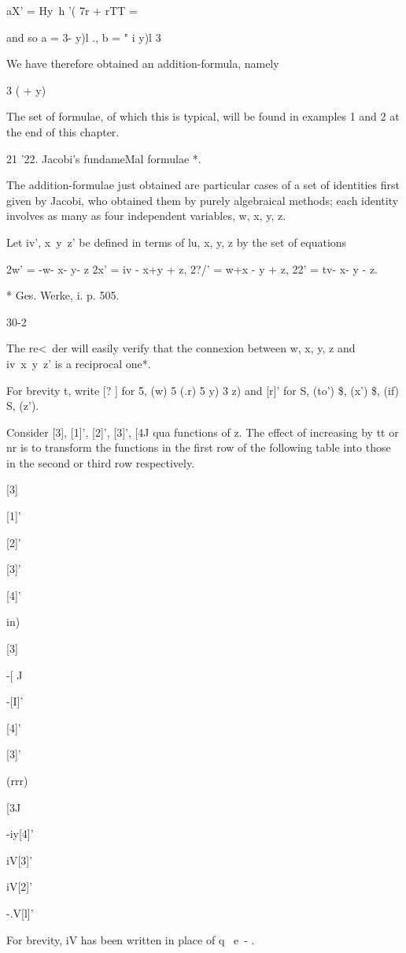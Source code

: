 aX' = Hy\ h '( 7r + rTT = %

and so a = 3- y)l ., b = " i y)l 3\

We have therefore obtained an addition-formula, namely

 3 ( + y) %

The set of formulae, of which this is typical, will be found in
examples 1 and 2 at the end of this chapter.

21 '22. Jacobi's fundameMal formulae *.

The addition-formulae just obtained are particular cases of a set of
identities first given by Jacobi, who obtained them by purely
algebraical methods; each identity involves as many as four
independent variables, w, x, y, z.

Let iv', x\ y\ z' be defined in terms of lu, x, y, z by the set of
equations

2w' = -w- x- y- z 2x' = iv - x+y + z, 2?/' = w+x - y + z, 22' = tv- x-
y - z.

* Ges. Werke, i. p. 505.

30-2

%
%

The re<\ der will easily verify that the connexion between w, x, y, z
and iv\ x\ y\ z' is a reciprocal one*.

For brevity t, write [? ] for 5, (w) 5 (.r) 5 y) 3 z) and [r]' for S,
(to') \$, (x') \$, (if) S, (z').

Consider [3], [1]', [2]', [3]', [4J qua functions of z. The effect of
increasing by tt or nr is to transform the functions in the first row
of the following table into those in the second or third row
respectively.

[3]

[1]'

[2]'

[3]'

[4]'

in)

[3]

-[ J

-[I]'

[4]'

[3]'

(rrr)

 [3J

-iy[4]'

iV[3]'

iV[2]'

-.V[l]'

For brevity, iV has been written in place of q~ e~- .

